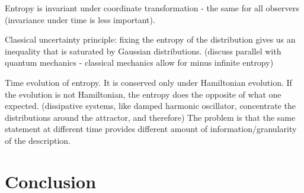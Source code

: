 \documentclass{article}
\begin{document}
Entropy is invariant under coordinate transformation - the same for all observers (invariance under time is less important).

Classical uncertainty principle: fixing the entropy of the distribution gives us an inequality that is saturated by Gaussian distributions. (discuss parallel with quantum mechanics - classical mechanics allow for minus infinite entropy)

Time evolution of entropy. It is conserved only under Hamiltonian evolution. If the evolution is not Hamiltonian, the entropy does the opposite of what one expected. (dissipative systems, like damped harmonic oscillator, concentrate the distributions around the attractor, and therefore) The problem is that the same statement at different time provides different amount of information/granularity of the description.


\section{Conclusion}
	
\end{document}
